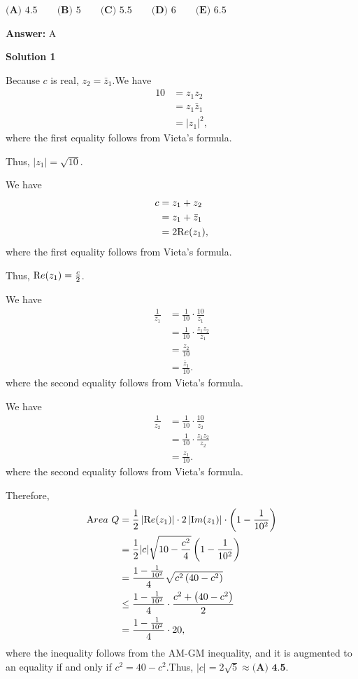 \begin{enumerate}
 $\textbf{(A) }4.5 \qquad\textbf{(B) }5 \qquad\textbf{(C) }5.5 \qquad\textbf{(D) }6\qquad\textbf{(E) }6.5$

 \textbf{Answer: }A



\textbf{Solution 1}

Because $c$ is real, $z_2 = \bar z_1$.We have
 \begin{align*} 10 & = z_1 z_2 \\ & = z_1 \bar z_1 \\ & = |z_1|^2 , \end{align*}
where the first equality follows from Vieta's formula.

 Thus, $|z_1| = \sqrt{10}$.

 We have
 \begin{align*} c & = z_1 + z_2 \\ & = z_1 + \bar z_1 \\ & = 2 {\textrm Re}(z_1), \end{align*}
where the first equality follows from Vieta's formula.

 Thus, ${\textrm Re}(z_1) = \frac{c}{2}$.

 We have
 \begin{align*} \frac{1}{z_1} & = \frac{1}{10}\cdot\frac{10}{z_1} \\ & = \frac{1}{10}\cdot\frac{z_1 z_2}{z_1} \\ & = \frac{z_2}{10} \\ & = \frac{\bar z_1}{10}. \end{align*}
where the second equality follows from Vieta's formula.

 We have
 \begin{align*} \frac{1}{z_2} & = \frac{1}{10}\cdot\frac{10}{z_2} \\ & = \frac{1}{10}\cdot\frac{z_1 z_2}{z_2} \\ & = \frac{z_1}{10}. \end{align*}
where the second equality follows from Vieta's formula.

 Therefore,
 \begin{align*} {\textrm Area} \ Q & = \frac{1}{2} \left| {\textrm Re}(z_1) \right| \cdot 2 \left| {\textrm Im}(z_1) \right| \cdot \left( 1 - \frac{1}{10^2} \right) \\ & = \frac{1}{2} |c| \sqrt{10 - \frac{c^2}{4}} \left( 1 - \frac{1}{10^2} \right) \\ & = \frac{1 - \frac{1}{10^2}}{4} \sqrt{c^2 \left( 40 - c^2 \right)} \\ & \leq \frac{1 - \frac{1}{10^2}}{4} \cdot \frac{c^2 + \left( 40 - c^2 \right)}{2} \\ & = \frac{1 - \frac{1}{10^2}}{4} \cdot 20 , \end{align*}
where the inequality follows from the AM-GM inequality, and it is augmented to an equality if and only if $c^2 = 40 - c^2$.Thus, $|c| = 2 \sqrt{5} \approx \boxed{\textbf{(A) 4.5}}$.


\end{enumerate}
